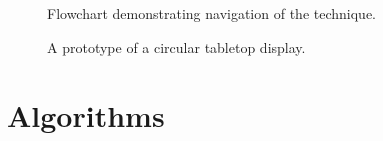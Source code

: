 \documentclass{bmcart}
\begin{document}
\begin{backmatter}
\begin{figure}[h!] 
 \centering
   \caption{
   Flowchart demonstrating navigation of the technique.}
   \label{fig:flowchart}
\end{figure}

\begin{figure}[h!]
 \centering
   \caption{
   A prototype of a circular tabletop display.}
   \label{fig:prototypeTabletop}
\end{figure}






\pagebreak
\section*{Algorithms}


\end{backmatter}
\end{document}
